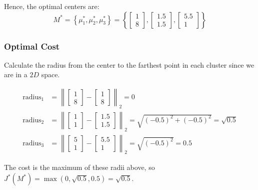 \documentclass{article}
\begin{document}
\begin{flushleft}
\begin{enumerate}
\begin{enumerate}
  \end{enumerate}
\end{enumerate}
\vspace{0.25cm}
Hence, the optimal centers are:
$$ M^* = \left\{ \mu_1^*, \mu_2^*, \mu_3^* \right\} = \left\{ \begin{bmatrix}1 \\ 8\end{bmatrix}, \begin{bmatrix}1.5 \\ 1.5\end{bmatrix}, \begin{bmatrix}5.5 \\ 1\end{bmatrix} \right\} $$
\end{flushleft}

\subsubsection*{Optimal Cost}
\begin{flushleft}
Calculate the radius from the center to the farthest point in each cluster since we are in a $2D$ space.
\end{flushleft}
\begin{align*}
    \text{radius}_1 &= \left\lVert \begin{bmatrix}1 \\ 8\end{bmatrix} - \begin{bmatrix}1 \\ 8\end{bmatrix} \right\rVert_2 = 0 \\
    \text{radius}_2 &= \left\lVert \begin{bmatrix}1 \\ 1\end{bmatrix} - \begin{bmatrix}1.5 \\ 1.5\end{bmatrix} \right\rVert_2 = \sqrt{(-0.5)^2 + (-0.5)^2} = \sqrt{0.5} \\
    \text{radius}_3 &= \left\lVert \begin{bmatrix}5 \\ 1\end{bmatrix} - \begin{bmatrix}5.5 \\ 1\end{bmatrix} \right\rVert_2 = \sqrt{(-0.5)^2} = 0.5
\end{align*}
\begin{flushleft}
The cost is the maximum of these radii above, so $J^*(M^*) = \max(0, \sqrt{0.5}, 0.5) = \sqrt{0.5}$.
\end{flushleft}
\end{document}
